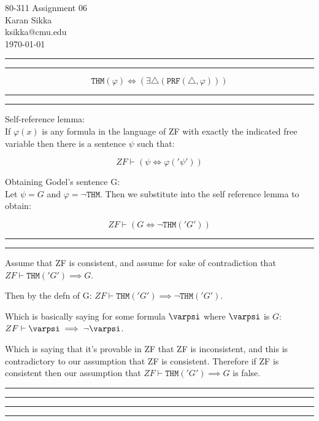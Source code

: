 \documentclass[11pt,letterpaper]{article}
\makeatletter
\newcommand{\question}[1] {\vspace{.25in} \hrule\vspace{0.5em}
\noindent{\bf #1} \vspace{0.5em}
\hrule \vspace{.10in}}
\newcommand{\myname}{Karan Sikka}
\newcommand{\myandrew}{ksikka@cmu.edu}
\newcommand{\myhwnum}{06}
\makeatother
\begin{document}
\medskip

\thispagestyle{plain}
\begin{center}                  %
{\Large 80-311 Assignment \myhwnum} \\
\myname \\
\myandrew \\
\today
\end{center}

\question{1.1}
$$ \mathtt{THM}(\varphi) \iff (\exists \triangle (\mathtt{PRF}(\triangle, \varphi))) $$

\question{1.2}
Self-reference lemma: \\
If $\varphi(x)$ is any formula in the language of ZF
with exactly the indicated free variable then there is a sentence $\psi$
such that:

$$ ZF \vdash (\psi \iff \varphi('\psi')) $$

Obtaining Godel's sentence G: \\
Let $\psi = G$ and $\varphi = \neg \mathtt{THM}$. Then we substitute into the self reference lemma to obtain:

$$ ZF \vdash (G \iff \neg \mathtt{THM}('G')) $$

\question{1.3}
Assume that ZF is consistent, and assume for sake of contradiction that $ZF \vdash \mathtt{THM}('G') \implies G$.

Then by the defn of G:
$ZF \vdash \mathtt{THM}('G') \implies \neg \mathtt{THM}('G')$.

Which is basically saying for some formula $\varpsi$ where $\varpsi$ is $G$:
$ZF \vdash \varpsi \implies \neg \varpsi$.

Which is saying that it's provable in ZF that ZF is inconsistent, and this is contradictory to our assumption that ZF is consistent. Therefore
if ZF is consistent then our assumption that $ZF \vdash \mathtt{THM}('G') \implies G$ is false.

\question{2.1}
\question{2.2}
\end{document}
